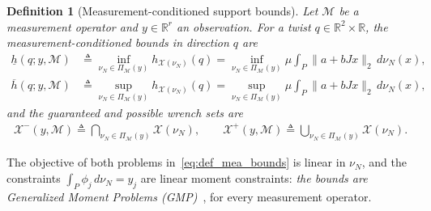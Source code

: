\documentclass[11pt,a4paper]{article}
\theoremstyle{plain}
\newtheorem{definition}[theorem]{Definition}
\newcommand{\R}{\mathbb{R}}
\newcommand{\X}{\mathcal X}
\begin{document}
\begin{definition}[Measurement-conditioned support bounds]\label{def:measurement_support_bounds}
Let $\mathcal M$ be a measurement operator and $y\in\R^r$ an observation. For a twist $q\in\mathbb R^2\times\mathbb R$, the \textit{measurement-conditioned bounds in direction $q$} are
\begin{align}
    \label{eq:def_mea_bounds}
    \underline h(q;y,\mathcal M)
    &\triangleq
    \inf_{\nu_N\in\Pi_{\mathcal M}(y)}
    h_{\X(\nu_N)}(q)
    =\inf_{\nu_N\in\Pi_{\mathcal M}(y)}\mu\int_P\|a+bJx\|_2\,d\nu_N(x),\\
    \overline h(q;y,\mathcal M)
    &\triangleq
    \sup_{\nu_N\in\Pi_{\mathcal M}(y)}
    h_{\X(\nu_N)}(q)
    =\sup_{\nu_N\in\Pi_{\mathcal M}(y)}\mu\int_P\|a+bJx\|_2\,d\nu_N(x),
\end{align}
and the \textit{guaranteed} and \textit{possible} wrench sets are
\begin{align}
    \X^-(y,\mathcal M)\triangleq\bigcap_{\nu_N\in\Pi_{\mathcal M}(y)}\X(\nu_N),
    \qquad
    \X^+(y,\mathcal M)\triangleq\bigcup_{\nu_N\in\Pi_{\mathcal M}(y)}\X(\nu_N).
\end{align}
\end{definition}
The objective of both problems in~\eqref{eq:def_mea_bounds} is linear in $\nu_N$, and the constraints $\int_P\phi_j\,d\nu_N=y_j$ are linear moment constraints:
\textit{the bounds are Generalized Moment Problems (GMP)}~\cite{lasserre2010moments}, for every measurement operator.
\end{document}
